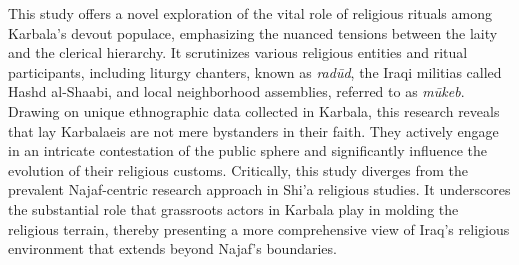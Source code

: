 This study offers a novel exploration of the vital role of religious rituals among Karbala's devout populace, emphasizing the nuanced tensions between the laity and the clerical hierarchy. It scrutinizes various religious entities and ritual participants, including liturgy chanters, known as \emph{radūd}, the Iraqi militias called Hashd al-Shaabi, and local neighborhood assemblies, referred to as \emph{mūkeb}. Drawing on unique ethnographic data collected in Karbala, this research reveals that lay Karbalaeis are not mere bystanders in their faith. They actively engage in an intricate contestation of the public sphere and significantly influence the evolution of their religious customs. Critically, this study diverges from the prevalent Najaf-centric research approach in Shi'a religious studies. It underscores the substantial role that grassroots actors in Karbala play in molding the religious terrain, thereby presenting a more comprehensive view of Iraq's religious environment that extends beyond Najaf's boundaries.

